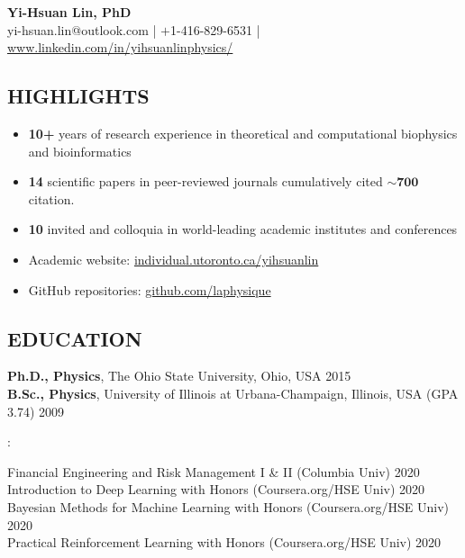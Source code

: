 \documentclass[11pt,letterpaper, sans]{article}
\makeatletter
\newcommand{\newsec}[1]{\subsection*{\hspace{-1.5pt}\uppercase{#1}}}
\newcommand{\newsubsec}[1]{\vspace{0.2cm}{\bf #1}\vspace{0.1cm}}
\def\name{Yi-Hsuan Lin, PhD}
\def\header{
\begin{center}
{\LARGE\bf \name} \vspace{0.3cm} \\
yi-hsuan.lin@outlook.com
| $+$1-416-829-6531 | 
\href{https://www.linkedin.com/in/yihsuanlinphysics/}{www.linkedin.com/in/yihsuanlinphysics/}
\end{center}
}
\makeatother
\begin{document}
\header

\begin{flushleft}



\newsec{Highlights}

\begin{itemize}[leftmargin=*]\itemsep-0.2em
\item {\bf 10+} years of research experience in theoretical and computational biophysics and bioinformatics
\item {\bf 14} scientific papers in peer-reviewed journals
cumulatively cited $\bm{ \sim\!700}$ citation. %
\item {\bf 10} invited and colloquia in world-leading academic institutes and conferences
\item Academic website: \href{http://individual.utoronto.ca/yihsuanlin}{individual.utoronto.ca/yihsuanlin}
\item GitHub repositories: \href{https://github.com/laphysique}{github.com/laphysique} 
\end{itemize}

\newsec{Education}

{\bf Ph.D., Physics}, The Ohio State University, Ohio, USA \hfill 2015 \\
{\bf B.Sc., Physics}, University of Illinois at Urbana-Champaign, Illinois, USA (GPA 3.74) \hfill 2009

\newsubsec{Certificates}: 

Financial Engineering and Risk Management I \& II (Columbia Univ) \hfill 2020 \\
Introduction to Deep Learning with Honors (Coursera.org/HSE Univ)  \hfill 2020 \\
Bayesian Methods for Machine Learning with Honors (Coursera.org/HSE Univ)  \hfill 2020 \\
Practical Reinforcement Learning with Honors (Coursera.org/HSE Univ)  \hfill 2020 \\


\end{flushleft}
\end{document}
